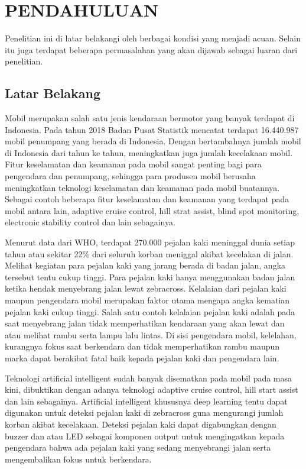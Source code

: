 \chapter{PENDAHULUAN}
\label{chap:pendahuluan}


Penelitian ini di latar belakangi oleh berbagai kondisi yang menjadi acuan. Selain itu juga terdapat beberapa permasalahan yang akan dijawab sebagai luaran dari penelitian.

\section{Latar Belakang}
\label{sec:latarbelakang}

Mobil merupakan salah satu jenis kendaraan bermotor yang banyak terdapat di Indonesia. Pada tahun 2018 Badan Pusat Statistik mencatat terdapat 16.440.987 mobil penumpang yang berada di Indonesia. Dengan bertambahnya jumlah mobil di Indonesia dari tahun ke tahun, meningkatkan juga jumlah kecelakaan mobil. Fitur keselamatan dan keamanan pada mobil sangat penting bagi para pengendara dan penumpang, sehingga para produsen mobil berusaha meningkatkan teknologi keselamatan dan keamanan pada mobil buatannya. Sebagai contoh beberapa fitur keselamatan dan keamanan yang
terdapat pada mobil antara lain, adaptive cruise control, hill strat assist, blind spot monitoring, electronic stability control dan lain sebagainya.

Menurut data dari WHO, terdapat 270.000 pejalan kaki meninggal dunia setiap tahun atau sekitar 22\% dari seluruh korban meniggal akibat kecelakan di jalan. Melihat kegiatan para pejalan kaki yang jarang berada di badan jalan, angka tersebut tentu cukup tinggi. Para pejalan kaki hanya menggunakan badan jalan ketika hendak menyebrang jalan lewat zebracross. Kelalaian dari pejalan kaki maupun pengendara mobil merupakan faktor utama mengapa angka kematian pejalan kaki cukup tinggi. Salah satu contoh kelalaian pejalan kaki adalah pada saat menyebrang jalan tidak memperhatikan kendaraan yang akan lewat dan atau melihat rambu serta lampu lalu lintas. Di sisi pengendara mobil, kelelahan,
kurangnya fokus saat berkendara dan tidak memperhatikan rambu maupun marka dapat berakibat fatal
baik kepada pejalan kaki dan pengendara lain.

Teknologi artificial intelligent sudah banyak disematkan pada mobil pada masa kini, dibuktikan
dengan adanya teknologi adaptive cruise control, hill start assist dan lain sebagainya. Artificial intelligent khususnya deep learning tentu dapat digunakan untuk deteksi pejalan kaki di zebracross guna mengurangi jumlah korban akibat kecelakaan. Deteksi pejalan kaki dapat digabungkan dengan buzzer dan atau LED sebagai komponen output untuk mengingatkan kepada pengendara bahwa ada pejalan kaki yang sedang menyebrangi jalan serta mengembalikan fokus untuk berkendara.

